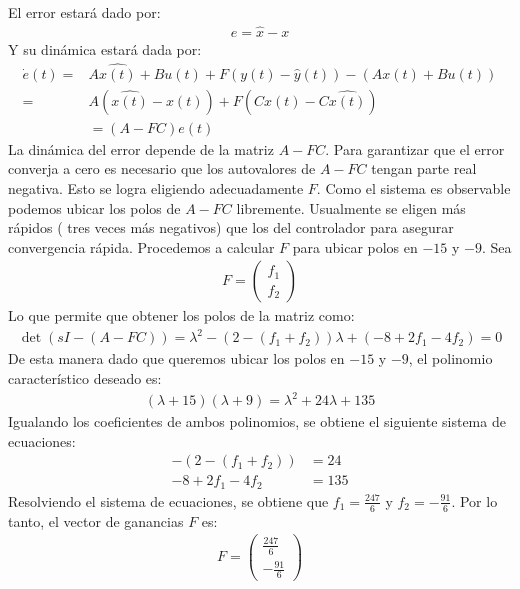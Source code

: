 \documentclass[
  11pt,
  letterpaper,
   addpoints,
   answers
  ]{exam}
\begin{document}
\begin{questions}
\begin{solution}
\begin{figure}[H]
  \end{figure}
El error estará dado por:
  \begin{align}
    e = \hat x - x
  \end{align}
  Y su dinámica estará dada por:
  \begin{align}
    \dot{e}(t) =& A\hat{x(t)} + Bu(t) + F(y(t) - \hat{y}(t)) - (Ax(t) + Bu(t)) \\
    =& A(\hat{x(t)} - x(t)) + F(Cx(t) - C\hat{x(t)})\\
     &= (A - FC)e(t)
  \end{align}
  La dinámica del error depende de la matriz $A - FC$. Para garantizar que el error converja a cero es necesario que los autovalores de $A - FC$ tengan parte real negativa. Esto se logra eligiendo adecuadamente $F$. Como el sistema es observable podemos ubicar los polos de $A - FC$ libremente. Usualmente se eligen más rápidos ( tres veces más negativos) que los del controlador para asegurar convergencia rápida. Procedemos a calcular $F$ para ubicar polos en $-15$ y $-9$. Sea
  \begin{align}
    F = \begin{pmatrix} f_1 \\ f_2 \end{pmatrix}
  \end{align}
  Lo que permite que obtener los polos de la matriz como:
  \begin{align}
    \det(sI - (A - FC)) = \lambda^{2} - (2 - (f_1 + f_2))\lambda + (-8 + 2f_1 - 4f_2) = 0
  \end{align}
  De esta manera dado que queremos ubicar los polos en $-15$ y $-9$, el polinomio característico deseado es:
  \begin{align}
    (\lambda + 15)(\lambda + 9) = \lambda^{2} + 24\lambda + 135
  \end{align}
  Igualando los coeficientes de ambos polinomios, se obtiene el siguiente sistema de ecuaciones:
  \begin{align}
    -(2 - (f_1 + f_2)) &= 24 \\
    -8 + 2f_1 - 4f_2 &= 135
  \end{align}
  Resolviendo el sistema de ecuaciones, se obtiene que $f_1 = \frac{247}{6}$ y $f_2 = -\frac{91}{6}$. Por lo tanto, el vector de ganancias $F$ es:
  \begin{align}
    F = \begin{pmatrix} \frac{247}{6} \\ -\frac{91}{6} \end{pmatrix}
  \end{align}

\end{solution}
\end{questions}
\end{document}
